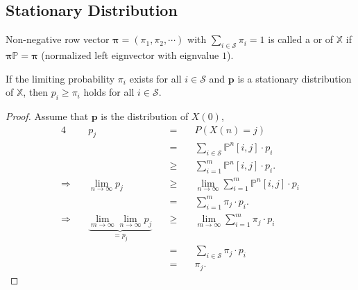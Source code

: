 \subsection{Stationary Distribution}

\begin{definition}
Non-negative row vector $ \boldsymbol\pi = (\pi_{1}, \pi_{2}, \cdots) $ with $ \sum_{i \in \mathcal{S}} \pi_{i} = 1 $ is called a  or  of $ \mathbb{X} $ if $ \boldsymbol\pi \mathbb{P} = \boldsymbol\pi $ (normalized left eignvector with eignvalue $ 1 $).

\begin{comment}
Why ``steady-state''?

If $ P(X(0) = i) = \pi_{i} $ for all $ i \in \mathcal{S} $, then
\begin{eqnarray*}
P(X(1) = i)
  & = & \sum_{i \in \mathcal{S}} P(X(1) = j \mid X(0) = i) \cdot P(X(0) = i) \\
  & = & \sum_{i \in \mathcal{S}} \pi_{i} \cdot \mathbb{P}[i, j] \\
  & = & \pi_{j},
\end{eqnarray*}
for all $ j \in \mathcal{S} $.
\end{comment}
\end{definition}

\begin{inequality} \label{ineq:p-ge-pi}
If the limiting probability $ \pi_{i} $ exists for all $ i \in \mathcal{S} $ and $ \mathbf{p} $ is a stationary distribution of $ \mathbb{X} $, then $ p_{i} \ge \pi_{i} $ holds for all $ i \in \mathcal{S} $.

\begin{proof}
Assume that $ \mathbf{p} $ is the distribution of $ X(0) $,
\begin{alignat*}{4}
  & p_{j}
    & \quad=\quad & P(X(n) = j) \\
  & & \quad=\quad & \sum_{i \in \mathcal{S}} \mathbb{P}^{n}[i, j] \cdot p_{i} \\
  & & \quad\ge\quad & \sum_{i = 1}^{m} \mathbb{P}^{n}[i, j] \cdot p_{i}. \\
\Rightarrow\quad
  & \lim_{n \to \infty} p_{j}
    & \quad\ge\quad & \lim_{n \to \infty} \sum_{i = 1}^{m} \mathbb{P}^{n}[i, j] \cdot p_{i} \\
  & & \quad=\quad & \sum_{i = 1}^{m} \pi_{j} \cdot p_{i}. \\
\Rightarrow\quad
  & \underbrace{\lim_{m \to \infty} \lim_{n \to \infty} p_{j}}_{= p_{j}}
    & \quad\ge\quad & \lim_{m \to \infty} \sum_{i = 1}^{m} \pi_{j} \cdot p_{i} \\
  & & \quad=\quad & \sum_{i \in \mathcal{S}} \pi_{j} \cdot p_{i} \\
  & & \quad=\quad & \pi_{j}.
\end{alignat*}
\end{proof}
\end{inequality}

